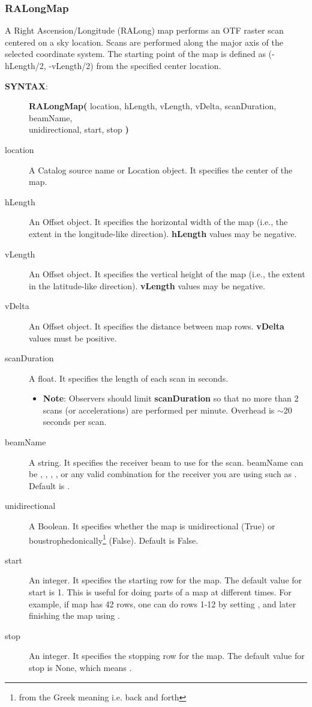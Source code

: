 \newpage

\subsubsection{RALongMap}

A Right Ascension/Longitude (RALong) map performs an \gls{OTF} raster scan centered
on a  sky location. Scans are performed along the major axis of the selected coordinate
system. The starting point of the map is defined as (-hLength/2, -vLength/2) from the specified
center location.

\begin{description}
\item[{\bf SYNTAX}:]
{\bfseries{\textcolor{pythonKeywords}{RALongMap}}(}
location, hLength, vLength, vDelta, scanDuration, beamName,\\
unidirectional, start, stop
{\bf)}
\item[location] A Catalog source name or Location object. It specifies the 
center of the map.
\item[hLength] An Offset object. It specifies the horizontal width of the 
map (i.e., the extent in the longitude-like direction). {\bf hLength} values
may be negative.
\item[vLength] An Offset object. It specifies the vertical height of the 
map (i.e., the extent in the latitude-like direction). {\bf vLength} values
may be negative.
\item[vDelta] An Offset object. It specifies the distance between map rows. 
{\bf vDelta} values must be positive.
\item[scanDuration] A float. It specifies the length of each scan in 
seconds.
\begin{itemize}
\item {\bf Note}: Observers should limit {\bf scanDuration} so that no
more than 2 scans (or accelerations) are performed per minute.  Overhead
is $\sim$20 seconds per scan.
\end{itemize}
\item[beamName] A string. It specifies the receiver beam to use for the 
scan. beamName can be , , , ,  or any valid
combination for the receiver you are using such as . Default is .
\item[unidirectional] A Boolean. It specifies whether the map is 
unidirectional (True) or boustrophedonically\footnote{from the Greek meaning 
 i.e. back and forth}  (False). Default is False.
\item[start] An integer. It specifies the starting row for the map. The 
default value for start is 1.  This is useful for doing parts of a map
at different times.  For example, if map has 42 rows, one can do rows
1-12 by setting , and later finishing the map
using .
\item[stop] An integer. It specifies the stopping row for the map. The 
default value for stop is None, which means .


\end{description}
